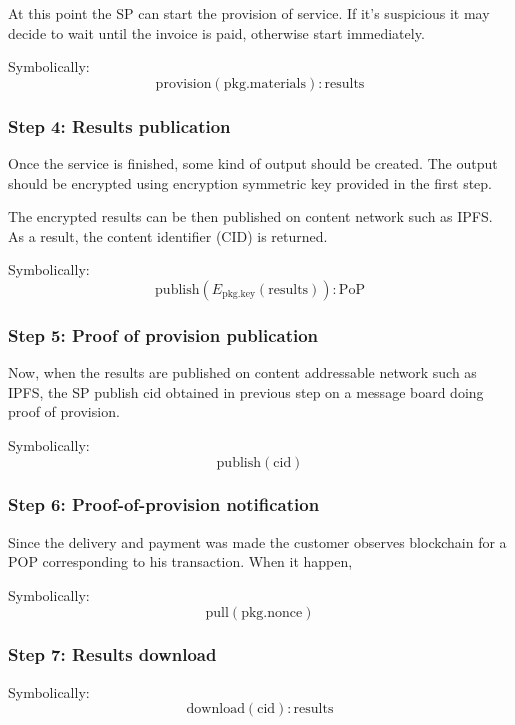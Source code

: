 \documentclass{ieeeaccess}
\begin{document}
At this point the SP can start the provision of service. If it's
suspicious it may decide to wait until the invoice is paid, otherwise
start immediately.

Symbolically: \[
\mathrm{provision}(\mathrm{pkg}.\mathrm{materials}) : \mathrm{results}
\]

\subsubsection{Step 4: Results
publication}\label{step-4-results-publication}

Once the service is finished, some kind of output should be created. The
output should be encrypted using encryption symmetric key provided in
the first step.

The encrypted results can be then published on content network such as
IPFS. As a result, the content identifier (CID) is returned.

Symbolically: \[
 \mathrm{publish}(E_{\mathrm{pkg}.\mathrm{key}}(\mathrm{results})) : \mathrm{PoP}
\]

\subsubsection{Step 5: Proof of provision
publication}\label{step-5-proof-of-provision-publication}

Now, when the results are published on content addressable network such
as IPFS, the SP publish \(\mathrm{cid}\) obtained in previous step on a
message board doing proof of provision.

Symbolically: \[\mathrm{publish}(\mathrm{cid})\]

\subsubsection{Step 6: Proof-of-provision
notification}\label{step-6-proof-of-provision-notification}

Since the delivery and payment was made the customer observes blockchain
for a POP corresponding to his transaction. When it happen,

Symbolically: \[
\mathrm{pull}(\mathrm{pkg.nonce})
\]

\subsubsection{Step 7: Results download}\label{step-7-results-download}

Symbolically: \[
\mathrm{download}(\mathrm{cid}) : \mathrm{results}
\]
\end{document}
